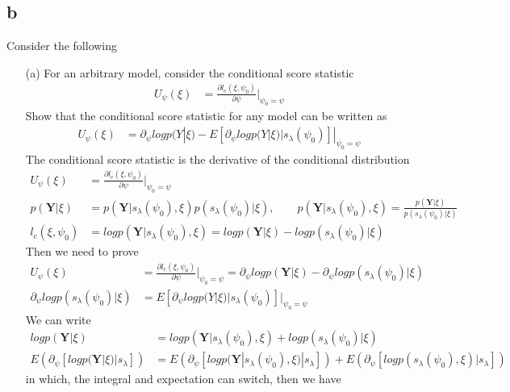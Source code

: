 \documentclass[11pt]{article} %
\begin{document}
\subsection{b}Consider the following
\begin{itemize}
	\item[(a)] For an arbitrary model, consider the conditional score statistic
	\begin{align*}
		U_{\psi}(\xi) &= \frac{\partial l_c(\xi, \psi_0)}{\partial \psi} |_{\psi_0=\psi}
	\end{align*} 
	Show that the conditional score statistic for any model can be written as
	\begin{align*}
		U_{\psi}(\xi) &= \partial_{\psi} log p(Y|\xi)- E[\partial_{\psi} log p(Y|\xi)|s_{\lambda}(\psi_0)]|_{\psi_0=\psi}
	\end{align*} 
	The conditional score statistic is the derivative of the conditional distribution
	\begin{align*}
		U_{\psi}(\xi) &= \frac{\partial l_c(\xi, \psi_0)}{\partial \psi} |_{\psi_0=\psi}\\
		p(\textbf{Y}| \xi) &= p(\textbf{Y}|s_{\lambda}(\psi_0), \xi) p(s_{\lambda}(\psi_0) | \xi), \qquad p(\textbf{Y}|s_{\lambda}(\psi_0), \xi) = \frac{p(\textbf{Y}| \xi)}{p(s_{\lambda}(\psi_0) | \xi)} \\
		l_c(\xi, \psi_0) &= log p(\textbf{Y}|s_{\lambda}(\psi_0), \xi)= log p(\textbf{Y}| \xi) - log p(s_{\lambda}(\psi_0) | \xi)
	\end{align*}
	Then we need to prove 
	\begin{align*}
		U_{\psi}(\xi) &= \frac{\partial l_c(\xi, \psi_0)}{\partial \psi} |_{\psi_0=\psi} = \partial_{\psi} log p(\textbf{Y}| \xi) - \partial_{\psi} log p(s_{\lambda}(\psi_0) | \xi)\\
		\partial_{\psi} log p(s_{\lambda}(\psi_0) | \xi) &= E[\partial_{\psi} log p(Y|\xi)|s_{\lambda}(\psi_0)]|_{\psi_0=\psi}
	\end{align*}
	We can write
	\begin{align*}
		log p(\textbf{Y}| \xi) &= log  p(\textbf{Y}|s_{\lambda}(\psi_0), \xi) + log p(s_{\lambda}(\psi_0) | \xi)\\
		E \left( \partial_{\psi}[log p(\textbf{Y}| \xi)| s_{\lambda}]\right) &= E \left(\partial_{\psi}[log  p(\textbf{Y}|s_{\lambda}(\psi_0), \xi)|s_{\lambda}]\right) + E \left(\partial_{\psi}[log p(s_{\lambda}(\psi_0), \xi)|s_{\lambda}]\right)
	\end{align*}    
	in which, the integral and expectation can switch, then we have

\end{itemize}
\end{document}
